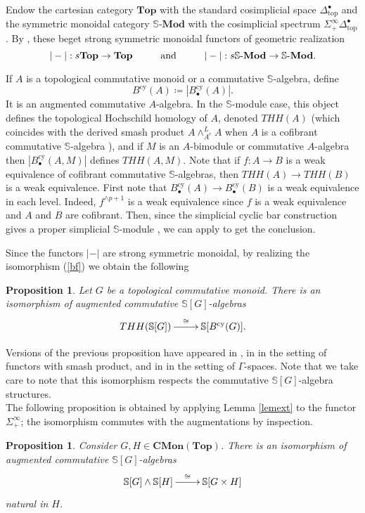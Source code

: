 \documentclass[a4paper,11pt]{amsart} %
\theoremstyle{definition} \newtheorem{defn}[equation]{Definition}
\theoremstyle{remark} \newtheorem{notation}[equation]{Notation}
\theoremstyle{plain} \newtheorem{teo}[equation]{Theorem}
\theoremstyle{plain} \newtheorem{lema}[equation]{Lemma}
\theoremstyle{plain} \newtheorem{prop}[equation]{Proposition}
\theoremstyle{plain} \newtheorem{corolario}[equation]{Corollary}
\theoremstyle{remark} \newtheorem{obs}[equation]{Remark}
\theoremstyle{remark} \newtheorem{sideobs}[equation]{Side remark}
\theoremstyle{remark} \newtheorem{ejercicio}[equation]{Exercise}
\theoremstyle{definition} \newtheorem{notn}[equation]{Notation}
\theoremstyle{remark} \newtheorem{ej}[equation]{Example}
\theoremstyle{remark} \newtheorem{contraej}[equation]{Counterexample}
\theoremstyle{plain} \newtheorem{conj}[equation]{Conjecture}
\renewcommand{\1}{\ensuremath{\mathbbm{1}}}
\renewcommand{\S}{\mathbb{S}}
\newcommand{\bprop}{\begin{prop}}
\newcommand{\eprop}{\end{prop}}
\newcommand{\CMon}{\ensuremath{\mathbf{CMon}}}
\newcommand{\SMod}{\ensuremath{\mathbb{S}}\mbox{-}\ensuremath{\textbf{Mod}}}
\newcommand{\Top}{\ensuremath{\mathbf{Top}}}
\newcommand{\cy}{\mathrm{cy}}
\newcommand{\sip}{\Sigma^\infty_+}
\renewcommand{\top}{\mathrm{top}}
\numberwithin{equation}{section}
\begin{document}
Endow the cartesian category $\Top$ with the standard cosimplicial space $\Delta_\top^\bullet$ and the symmetric monoidal category $\SMod$ with the cosimplicial spectrum $\sip \Delta^\bullet_\top$. By \cite[2.9]{stonek-graded}, 
these beget strong symmetric monoidal functors of geometric realization
\[|-|:s\Top \to \Top \hspace{1cm} \textup{and} \hspace{1cm} |-|:s\SMod \to \SMod.\]

If $A$ is a topological commutative monoid or a commutative $\S$-algebra, define \[B^\cy(A)\coloneqq|B^\cy_\bullet(A)|.\]
It is an augmented commutative $A$-algebra. In the $\S$-module case, this object defines the topological Hochschild homology of $A$, denoted $THH(A)$ (which coincides with the derived smash product $A \wedge^L_{A^e} A$ when $A$ is a cofibrant commutative $\S$-algebra \cite[IX.2.7]{ekmm}), %
and if $M$ is an $A$-bimodule or commutative $A$-algebra then $|B_\bullet^\cy(A,M)|$ defines $THH(A,M)$. Note that if $f:A\to B$ is a weak equivalence of cofibrant commutative $\S$-algebras, then $THH(A)\to THH(B)$ is a weak equivalence. First note that $B_\bullet^\cy(A)\to B_\bullet^\cy(B)$ is a weak equivalence in each level. Indeed, $f^{\wedge p+1}$ is a weak equivalence since $f$ is a weak equivalence and $A$ and $B$ are cofibrant. %
Then, since the simplicial cyclic bar construction gives a proper simplicial $\S$-module \cite[IX.2.8]{ekmm}, we can apply \cite[X.2.4]{ekmm} to get the conclusion. %

Since the functors $|-|$ are strong symmetric monoidal, by realizing the isomorphism (\ref{bf}) we obtain the following 

\bprop \label{conmutarTHH} Let $G$ be a topological commutative monoid. There is an isomorphism of augmented commutative $\S[G]$-algebras
\[\xymatrix{THH(\S[G])\ar[r]^-\cong & \S[B^\cy(G)].} \]
\eprop

Versions of the previous proposition have appeared in \cite[Remark 4.4]{svw}, in \cite[Theorem 7.1]{hesselholt-madsen97} in the setting of functors with smash product, and in \cite[Example 4.2.2.7]{dgm} in the setting of $\Gamma$-spaces. Note that we take care to note that this isomorphism respects the commutative $\S[G]$-algebra structures.\\

The following proposition is obtained by applying Lemma \ref{lemext} to the functor $\sip$; the isomorphism commutes with the augmentations by inspection.

\bprop \label{Smono} Consider $G, H\in \CMon(\Top)$. There is an isomorphism of augmented commutative $\S[G]$-algebras
\[\xymatrix{\S[G] \wedge \S[H] \ar[r]^-\cong &\S[G \times H]} \]
natural in $H$.
\eprop
\end{document}
